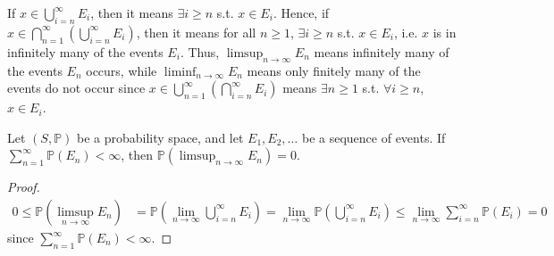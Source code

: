 \begin{remark}
    If \(x \in \bigcup_{i=n}^{\infty} E_i \), then it means \(\exists i \ge n\) s.t. \(x \in E_i\). Hence, if \(x \in \bigcap_{n=1}^{\infty}\left( \bigcup_{i=n}^{\infty} E_i \right)  \), then it means for all \(n \ge 1\), \(\exists i \ge n\) s.t. \(x \in E_i\), i.e. \(x\) is in infinitely many of the events \(E_i\). Thus, \(\limsup_{n \to \infty} E_n \) means infinitely many of the events \(E_n\) occurs, while \(\liminf_{n \to \infty} E_n \) means only finitely many of the events do not occur since \(x \in \bigcup_{n=1}^{\infty} \left( \bigcap_{i=n}^{\infty} E_i  \right)\) means \(\exists n \ge 1\) s.t. \(\forall i \ge n\), \(x \in E_i\).    
\end{remark}

\begin{theorem}
    Let \((S, \mathbb{P} )\) be a probability space, and let \(E_1, E_2, \dots \) be a sequence of events. If \(\sum_{n=1}^{\infty} \mathbb{P} (E_n) < \infty  \), then \(\mathbb{P} \left( \limsup_{n \to \infty} E_n  \right) = 0 \).    
\end{theorem}

\begin{proof}
    \begin{align*}
        0 \le \mathbb{P} \left( \limsup_{n \to \infty} E_n  \right) &= \mathbb{P} \left( \lim_{n \to \infty} \bigcup_{i=n}^{\infty} E_i   \right) = \lim_{n \to \infty} \mathbb{P} \left( \bigcup_{i=n}^{\infty} E_i  \right) \le \lim_{n \to \infty} \sum_{i=n}^{\infty} \mathbb{P} (E_i) = 0      
    \end{align*}
    since \(\sum_{n=1}^{\infty} \mathbb{P} (E_n) < \infty  \). 
\end{proof}